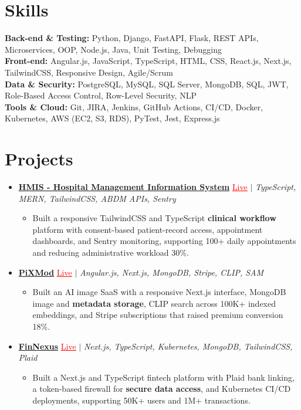 \documentclass[letterpaper,10pt]{article}
\newcommand{\itemTail}{\vspace{-4pt}}
\newcommand{\sectionGap}{\vspace{-8pt}}
\newcommand{\projGap}{\vspace{3pt}}
\newcommand{\resumeItem}[1]{\item\small{{#1 \itemTail}}}
\newcommand{\resumeProjectHeading}[1]{\item \small #1 \vspace{-2pt}}
\newcommand{\resumeProjectLink}[2]{\href{#1}{\textcolor{red}{\underline{#2}}}}
\newcommand{\resumeSubHeadingListStart}{\begin{itemize}[leftmargin=0.0in, label={}]}
\newcommand{\resumeSubHeadingListEnd}{\end{itemize}}
\newcommand{\resumeProjItemListStart}{\begin{itemize}[leftmargin=0.15in,label=\textbullet,itemsep=3pt,topsep=0pt,parsep=0pt,partopsep=0pt]}
\newcommand{\resumeProjItemListEnd}{\end{itemize}\vspace{-4pt}}
\begin{document}
\section{Skills}
\begin{itemize}[leftmargin=0.15in, label={}]
\small{\item{
\textbf{Back-end \& Testing:} Python, Django, FastAPI, Flask, REST APIs, Microservices, OOP, Node.js, Java, Unit Testing, Debugging \\
\textbf{Front-end:} Angular.js, JavaScript, TypeScript, HTML, CSS, React.js, Next.js, TailwindCSS, Responsive Design, Agile/Scrum \\
\textbf{Data \& Security:} PostgreSQL, MySQL, SQL Server, MongoDB, SQL, JWT, Role-Based Access Control, Row-Level Security, NLP \\
\textbf{Tools \& Cloud:} Git, JIRA, Jenkins, GitHub Actions, CI/CD, Docker, Kubernetes, AWS (EC2, S3, RDS), PyTest, Jest, Express.js
}}
\end{itemize}
\sectionGap
\section{Projects}
\resumeSubHeadingListStart
\vspace{-2pt}
\resumeProjectHeading{\href{https://hims-rouge.vercel.app/}{\textbf{HMIS - Hospital Management Information System}} \resumeProjectLink{https://hims-rouge.vercel.app/}{Live} $|$ \emph{TypeScript, MERN, TailwindCSS, ABDM APIs, Sentry}}
\resumeProjItemListStart
\resumeItem{Built a responsive TailwindCSS and TypeScript \textbf{clinical workflow} platform with consent-based patient-record access, appointment dashboards, and Sentry monitoring, supporting 100+ daily appointments and reducing administrative workload 30\%.}
\resumeProjItemListEnd
\projGap
\resumeProjectHeading{\href{https://pixmod.vercel.app/}{\textbf{PiXMod}} \resumeProjectLink{https://pixmod.vercel.app/}{Live} $|$ \emph{Angular.js, Next.js, MongoDB, Stripe, CLIP, SAM}}
\resumeProjItemListStart
\resumeItem{Built an AI image SaaS with a responsive Next.js interface, MongoDB image and \textbf{metadata storage}, CLIP search across 100K+ indexed embeddings, and Stripe subscriptions that raised premium conversion 18\%.}
\resumeProjItemListEnd
\projGap
\resumeProjectHeading{\href{https://fin-nexus.vercel.app/}{\textbf{FinNexus}} \resumeProjectLink{https://fin-nexus.vercel.app/}{Live} $|$ \emph{Next.js, TypeScript, Kubernetes, MongoDB, TailwindCSS, Plaid}}
\resumeProjItemListStart
\resumeItem{Built a Next.js and TypeScript fintech platform with Plaid bank linking, a token-based firewall for \textbf{secure data access}, and Kubernetes CI/CD deployments, supporting 50K+ users and 1M+ transactions.}
\resumeProjItemListEnd
\resumeSubHeadingListEnd
\end{document}
